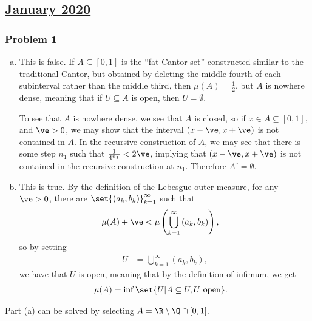 \documentclass[10pt]{mypackage}
\begin{document}
\subsection{\href{https://math.virginia.edu/graduate/exams/analysis/2020Jan_real.pdf}{January 2020}}%
\subsubsection{Problem 1}%
\begin{enumerate}[(a)]
  \item This is false. If $A\subseteq [0,1]$ is the ``fat Cantor set'' constructed similar to the traditional Cantor, but obtained by deleting the middle fourth of each subinterval rather than the middle third, then $\mu(A) = \frac{1}{2}$, but $A$ is nowhere dense, meaning that if $U\subseteq A$ is open, then $U = \emptyset$.\newline

    To see that $A$ is nowhere dense, we see that $A$ is closed, so if $x\in A\subseteq [0,1]$, and $\ve > 0$, we may show that the interval $\left( x-\ve,x+\ve \right)$ is not contained in $A$. In the recursive construction of $A$, we may see that there is some step $n_1$ such that $\frac{1}{4^{n_1}} < 2\ve$, implying that $\left( x-\ve,x+\ve \right)$ is not contained in the recursive construction at $n_1$. Therefore $A^{\circ} = \emptyset$.
  \item This is true. By the definition of the Lebesgue outer measure, for any $\ve > 0$, there are $\set{\left( a_k,b_k \right)}_{k=1}^{\infty}$ such that
    \begin{align*}
      \mu(A) + \ve &< \mu\left( \bigcup_{k=1}^{\infty}\left( a_k,b_k \right) \right),
    \end{align*}
    so by setting
    \begin{align*}
      U &= \bigcup_{k=1}^{\infty}\left( a_k,b_k \right),
    \end{align*}
    we have that $U$ is open, meaning that by the definition of infimum, we get 
    \begin{align*}
      \mu(A) &= \inf\set{U | A\subseteq U,U\text{ open}}.
    \end{align*}
\end{enumerate}
\begin{remark}
  Part (a) can be solved by selecting $A = \R\setminus \Q\cap [0,1]$.
\end{remark}
\end{document}
